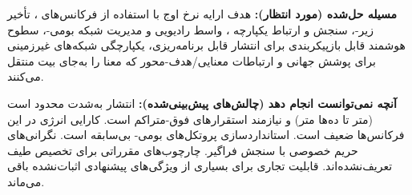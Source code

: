 
\textbf{مسیله حل‌شده (مورد انتظار):}  هدف ارایه نرخ اوج  با استفاده از فرکانس‌های ، تأخیر زیر-، سنجش و ارتباط یکپارچه ، واسط رادیویی و مدیریت شبکه بومی-، سطوح هوشمند قابل بازپیکربندی  برای انتشار قابل برنامه‌ریزی، یکپارچگی شبکه‌های غیرزمینی  برای پوشش جهانی و ارتباطات معنایی/\allowbreak{}هدف-محور که معنا را به‌جای بیت منتقل می‌کنند.

\textbf{آنچه نمی‌توانست انجام دهد (چالش‌های پیش‌بینی‌شده):} انتشار  به‌شدت محدود است (متر تا ده‌ها متر) و نیازمند استقرارهای فوق-متراکم است. کارایی انرژی در این فرکانس‌ها ضعیف است. استانداردسازی پروتکل‌های بومی- بی‌سابقه است. نگرانی‌های حریم خصوصی با سنجش فراگیر. چارچوب‌های مقرراتی برای تخصیص طیف  تعریف‌نشده‌اند. قابلیت تجاری برای بسیاری از ویژگی‌های پیشنهادی اثبات‌نشده باقی می‌ماند.









